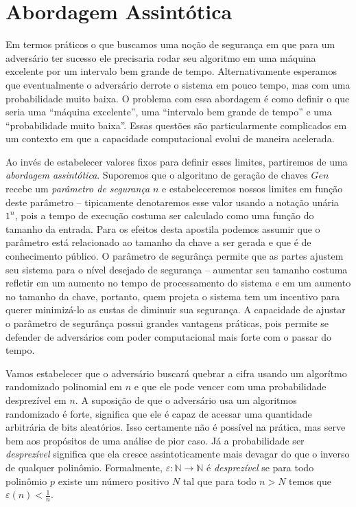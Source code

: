 \section{Abordagem Assintótica}
\label{sec:abord-assint}

Em termos práticos o que buscamos uma noção de segurança em que para um adversário ter sucesso ele precisaria rodar seu algoritmo em uma máquina excelente por um intervalo bem grande de tempo.
Alternativamente esperamos que eventualmente o adversário derrote o sistema em pouco tempo, mas com uma probabilidade muito baixa.
O problema com essa abordagem é como definir o que seria uma ``máquina excelente'', uma ``intervalo bem grande de tempo'' e uma ``probabilidade muito baixa''.
Essas questões são particularmente complicados em um contexto em que a capacidade computacional evolui de maneira acelerada.

Ao invés de estabelecer valores fixos para definir esses limites, partiremos de uma {\em abordagem assintótica}.
Suporemos que o algoritmo de geração de chaves $Gen$ recebe um {\em parâmetro de segurança} $n$ e estabeleceremos nossos limites em função deste parâmetro -- tipicamente denotaremos esse valor usando a notação unária $1^n$, pois a tempo de execução costuma ser calculado como uma função do tamanho da entrada.
Para os efeitos desta apostila podemos assumir que o parâmetro está relacionado ao tamanho da chave a ser gerada e que é de conhecimento público.
O parâmetro de segurânça permite que as partes ajustem seu sistema para o nível desejado de segurança -- aumentar seu tamanho costuma refletir em um aumento no tempo de processamento do sistema e em um aumento no tamanho da chave, portanto, quem projeta o sistema tem um incentivo para querer minimizá-lo as custas de diminuir sua segurança.
A capacidade de ajustar o parâmetro de segurânça possui grandes vantagens práticas, pois permite se defender de adversários com poder computacional mais forte com o passar do tempo. 

Vamos estabelecer que o adversário buscará quebrar a cifra usando um algorítmo randomizado polinomial em $n$ e que ele pode vencer com uma probabilidade desprezível em $n$.
A suposição de que o adversário usa um algoritmos randomizado é forte, significa que ele é capaz de acessar uma quantidade arbitrária de bits aleatórios.
Isso certamente não é possível na prática, mas serve bem aos propósitos de uma análise de pior caso.
Já a probabilidade ser {\em desprezível} significa que ela cresce assintoticamente mais devagar do que o inverso de qualquer polinômio.
Formalmente, $\varepsilon: \mathbb{N} \to \mathbb{N}$ é {\em desprezível} se para todo polinômio $p$ existe um número positivo $N$ tal que para todo $n > N$ temos que $\varepsilon(n) < \frac{1}{n}$.

